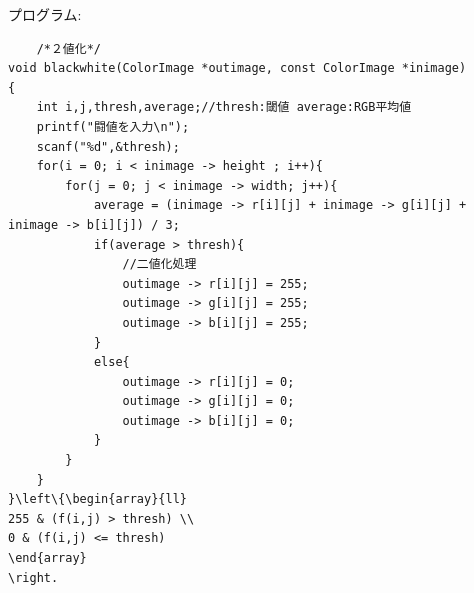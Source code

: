 \documentclass[a4paper,titlepage,11pt]{ltjsarticle}
\begin{document}
プログラム:
\begin{lstlisting}
	/*２値化*/
void blackwhite(ColorImage *outimage, const ColorImage *inimage)
{
	int i,j,thresh,average;//thresh:閾値 average:RGB平均値
	printf("闘値を入力\n");
	scanf("%d",&thresh);
	for(i = 0; i < inimage -> height ; i++){
		for(j = 0; j < inimage -> width; j++){
			average = (inimage -> r[i][j] + inimage -> g[i][j] + inimage -> b[i][j]) / 3;
			if(average > thresh){
				//二値化処理
				outimage -> r[i][j] = 255;
				outimage -> g[i][j] = 255;
				outimage -> b[i][j] = 255;
			}
			else{
				outimage -> r[i][j] = 0;
				outimage -> g[i][j] = 0;
				outimage -> b[i][j] = 0;
			}
		}
	}
}\left\{\begin{array}{ll}
255 & (f(i,j) > thresh) \\
0 & (f(i,j) <= thresh)
\end{array}
\right.
\end{lstlisting}
\end{document}
